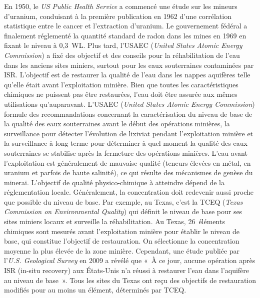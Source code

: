 \documentclass{article}
\begin{document}
En 1950, le \textit{US Public Health Service} a commencé une étude sur les mineurs d'uranium, conduisant à la première publication en 1962 d'une corrélation statistique entre le cancer et l'extraction d'uranium. Le gouvernement fédéral a finalement réglementé la quantité standard de radon dans les mines en 1969 en fixant le niveau à 0,3~WL.
Plus tard, l'USAEC (\textit{United States Atomic Energy Commission}) a fixé des objectif et des conseils pour la réhabilitation de l’eau dans les anciens sites miniers, surtout pour les eaux souterraines contaminées par ISR.
L’objectif est de restaurer la qualité de l'eau dans les nappes aquifères telle qu'elle était avant l'exploitation minière. Bien que toutes les caractéristiques chimiques ne puissent pas être restaurées, l'eau doit être assurée aux mêmes utilisations qu'auparavant. %
L'USAEC (\textit{United States Atomic Energy Commission}) formule des recommandations concernant la caractérisation du niveau de base de la qualité des eaux souterraines avant le début des opérations minières, la surveillance pour détecter l’évolution de lixiviat pendant l'exploitation minière et la surveillance à long terme pour déterminer à quel moment la qualité des eaux souterraines se stabilise après la fermeture des opérations minières.
L'eau avant l'exploitation est généralement de mauvaise qualité (teneurs élevées en métal, en uranium et parfois de haute salinité), ce qui résulte des mécanismes de genèse du minerai.
L'objectif de qualité physico-chimique à atteindre dépend de la réglementation locale. Généralement, la concentration doit redevenir aussi proche que possible du niveau de base.
Par exemple, au Texas, c’est la TCEQ (\textit{Texas Commission on Environmental Quality}) qui définit le niveau de base pour ses sites miniers locaux et surveille la réhabilitation.
Au Texas, 26~éléments chimiques sont mesurés avant l'exploitation minière pour établir le niveau de base, qui constitue l’objectif de restauration. On sélectionne la concentration moyenne la plus élevée de la zone minière.
Cependant, une étude publiée par l'\textit{U.S. Geological Survey} en 2009 a révélé que «~À ce jour, aucune opération après ISR (in-situ recovery) aux États-Unis n'a réussi à restaurer l'eau dans l'aquifère au niveau de base~».
Tous les sites du Texas ont reçu des objectifs de restauration modifiés pour au moins un élément, déterminés par TCEQ.
\end{document}
